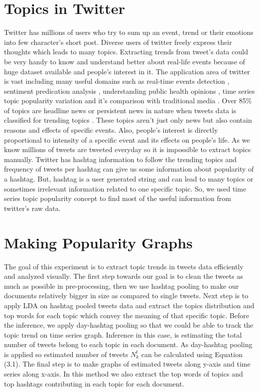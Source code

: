 \documentclass[a4paper]{report}
\begin{document}
\section{Topics in Twitter}
Twitter has millions of users who try to sum up an event, trend or their emotions into few character's short post. Diverse users of twitter freely express their thoughts which leads to many topics. Extracting trends from tweet’s data could be very handy to know and understand better about real-life events because of huge dataset available and people’s interest in it. The application area of twitter is vast including many useful domains such as real-time events detection \cite{sakaki2010earthquake}, sentiment predication analysis \cite{tumasjan2010predicting}, understanding public health opinions \cite{karami2018characterizing}, time series topic popularity variation \cite{fukuyama2018extracting} and it's comparison with traditional media \cite{zhao2011comparing}. Over 85\% of topics are headline news or persistent news in nature when tweets data is classified for trending topics  \cite{kwak2010twitter}. These topics aren't just only news but also contain reasons and effects of specific events. Also, people's interest is directly proportional to intensity of a specific event and its effects on people's life. As we know millions of tweets are tweeted everyday so it is impossible to extract topics manually. Twitter has hashtag information to follow the trending topics and frequency of tweets per hashtag can give us some information about popularity of a hashtag. But, hashtag is a user generated string and can lead to many topics or sometimes irrelevant information related to one specific topic. So, we used time series topic popularity concept to find most of the useful information from twitter's raw data.

\section{Making Popularity Graphs}
The goal of this experiment is to extract topic trends in tweets data efficiently and analyzed visually. The first step towards our goal is to clean the tweets as much as possible in pre-processing, then we use hashtag pooling to make our documents relatively bigger in size as compared to single tweets. Next step is to apply LDA on hashtag pooled tweets data and extract the topics distribution and top words for each topic which convey the meaning of that specific topic. Before the inference, we apply day-hashtag pooling so that we could be able to track the topic trend on time series graph. Inference in this case, is estimating the total number of tweets belong to each topic in each document. As day-hashtag pooling is applied so estimated number of tweets $N^t_k$ can be calculated using Equation (3.1). The final step is to make graphs of estimated tweets along y-axis and time series along x-axis. In this method we also extract the top words of topics and top hashtags contributing in each topic for each document.
\end{document}
